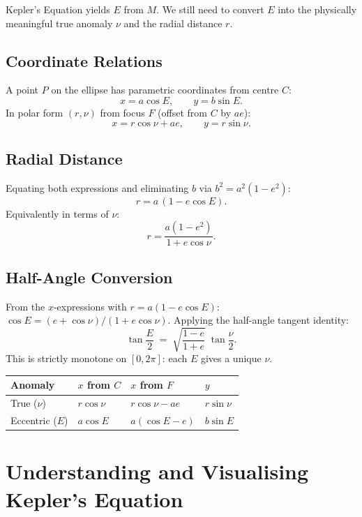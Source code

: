 \documentclass[12pt]{article}
\begin{document}
Kepler's Equation yields $E$ from $M$. We still need to convert $E$ into the
physically meaningful true anomaly $\nu$ and the radial distance $r$.

\subsection{Coordinate Relations}

A point $P$ on the ellipse has parametric coordinates from centre $C$:
\[
  x = a\cos E, \qquad y = b\sin E.
\]
In polar form $(r,\nu)$ from focus $F$ (offset from $C$ by $ae$):
\[
  x = r\cos\nu + ae, \qquad y = r\sin\nu.
\]

\subsection{Radial Distance}

Equating both expressions and eliminating $b$ via $b^2 = a^2(1-e^2)$:
\[
  \boxed{r = a\,(1 - e\cos E)}.
\]
Equivalently in terms of $\nu$:
\[
  r = \frac{a(1-e^2)}{1 + e\cos\nu}.
\]

\subsection{Half-Angle Conversion}

From the $x$-expressions with $r = a(1-e\cos E)$:
$\cos E = (e + \cos\nu)/(1 + e\cos\nu)$.
Applying the half-angle tangent identity:
\[
  \boxed{\tan\frac{E}{2} \;=\; \sqrt{\frac{1-e}{1+e}}\;\tan\frac{\nu}{2}}.
\]
This is strictly monotone on $[0, 2\pi]$: each $E$ gives a unique $\nu$.

\vspace{0.4cm}
\begin{center}
\renewcommand{\arraystretch}{1.6}
\begin{tabular}{llll}
  \toprule
  \textbf{Anomaly} & $x$ \textbf{from} $C$ & $x$ \textbf{from} $F$ & $y$ \\
  \midrule
  True ($\nu$)    & $r\cos\nu$  & $r\cos\nu - ae$  & $r\sin\nu$ \\
  Eccentric ($E$) & $a\cos E$   & $a(\cos E - e)$  & $b\sin E$  \\
  \bottomrule
\end{tabular}
\end{center}

\section{Understanding and Visualising Kepler's Equation}
\end{document}
